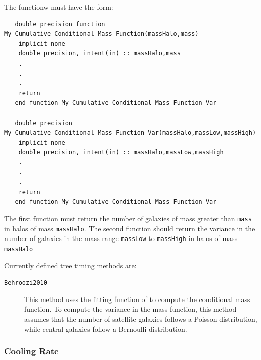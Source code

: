 The functionw must have the form:
\begin{verbatim}
   double precision function My_Cumulative_Conditional_Mass_Function(massHalo,mass)
    implicit none
    double precision, intent(in) :: massHalo,mass
    .
    .
    .
    return
   end function My_Cumulative_Conditional_Mass_Function_Var

   double precision My_Cumulative_Conditional_Mass_Function_Var(massHalo,massLow,massHigh)
    implicit none
    double precision, intent(in) :: massHalo,massLow,massHigh
    .
    .
    .
    return
   end function My_Cumulative_Conditional_Mass_Function_Var 
\end{verbatim}
The first function must return the number of galaxies of mass greater than {\tt mass} in halos of mass {\tt massHalo}. The second function should return the variance in the number of galaxies in the mass range {\tt massLow} to {\tt massHigh} in halos of mass {\tt massHalo}

Currently defined tree timing methods are:
\begin{description}
 \item [{\tt Behroozi2010}] This method uses the fitting function of \cite{behroozi_comprehensive_2010} to compute the conditional mass function. To compute the variance in the mass function, this method assumes that the number of satellite galaxies follows a Poisson distribution, while central galaxies follow a \gls{Bernoulli distribution}.
\end{description}

\subsubsection{Cooling Rate}

